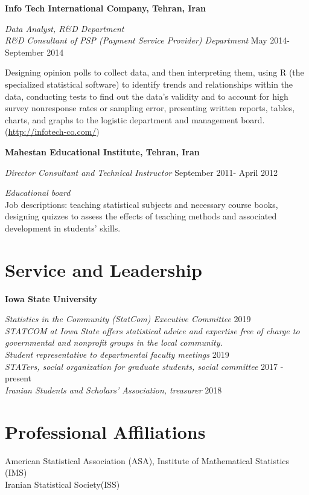 \documentclass[margin,line]{res}
\begin{document}
\begin{resume}
{\bf Info Tech International Company, Tehran, Iran }

{\em Data Analyst, R\&D Department\\ 
	 R\&D Consultant of PSP (Payment Service Provider) Department
} \hfill {  May 2014- September 2014}

\vspace{-.3cm}
Designing opinion polls to collect data, and then interpreting them, using R (the specialized statistical software) to identify trends and relationships within the data, conducting tests to find out the data’s validity and to account for high survey nonresponse rates or sampling error, presenting written reports, tables, charts, and graphs to the logistic department and management board.({\url{http://infotech-co.com/}})


{\bf Mahestan Educational Institute, Tehran, Iran }

{\em Director Consultant and Technical Instructor} \hfill {  September 2011- April 2012 }

\vspace{-.3cm}
{\em Educational board}\\
Job descriptions: teaching statistical subjects and necessary course books, designing quizzes to assess the effects of teaching methods and associated development in students’ skills. 



\section{\sc Service and Leadership}

{\bf Iowa State University}


{\em Statistics in the Community (StatCom) Executive Committee} \hfill { 2019}\\
{\em STATCOM at Iowa State offers statistical advice and expertise free of charge to governmental and nonprofit groups in the local community.}\\
{\em Student representative to departmental faculty meetings} \hfill { 2019 }\\
{\em STATers, social organization for graduate students, social committee} \hfill { 2017 - present}\\
{\em Iranian Students and Scholars' Association, treasurer} \hfill { 2018}



\section{\sc Professional Affiliations}
American Statistical Association (ASA), Institute of Mathematical Statistics (IMS)\\
Iranian Statistical Society(ISS)



\end{resume}
\end{document}
